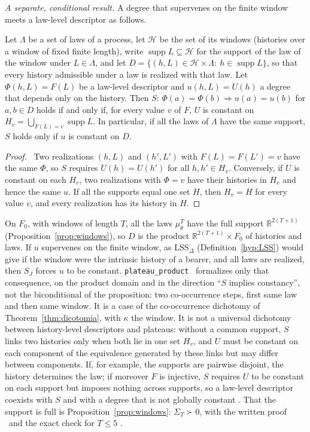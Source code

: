 \emph{A separate, conditional result.} A degree that supervenes on the finite window meets a law-level descriptor as follows.
\begin{proposition}[Plateau]\label{prop:gauss-plateau}
Let $\Lambda$ be a set of laws of a process, let $\mathcal H$ be the set of its windows (histories over a window of fixed finite length), write $\operatorname{supp}L\subseteq\mathcal H$ for the support of the law of the window under $L\in\Lambda$, and let $D=\{(h,L)\in\mathcal H\times\Lambda:\ h\in\operatorname{supp}L\}$, so that every history admissible under a law is realized with that law. Let $\Phi(h,L)=F(L)$ be a law-level descriptor and $u(h,L)=U(h)$ a degree that depends only on the history. Then $S$: $\Phi(a)=\Phi(b)\Rightarrow u(a)=u(b)$ for $a,b\in D$ holds if and only if, for every value $v$ of $F$, $U$ is constant on $H_v=\bigcup_{F(L)=v}\operatorname{supp}L$. In particular, if all the laws of $\Lambda$ have the same support, $S$ holds only if $u$ is constant on $D$.
\end{proposition}
\begin{proof}
\stA\ Two realizations $(h,L)$ and $(h',L')$ with $F(L)=F(L')=v$ have the same $\Phi$, so $S$ requires $U(h)=U(h')$ for all $h,h'\in H_v$. Conversely, if $U$ is constant on each $H_v$, two realizations with $\Phi=v$ have their histories in $H_v$ and hence the same $u$. If all the supports equal one set $H$, then $H_v=H$ for every value $v$, and every realization has its history in $H$.
\end{proof}
On $F_0$, with windows of length $T$, all the laws $\mu_\theta^T$ have the full support $\mathbb R^{2(T+1)}$ (Proposition~\ref{prop:windows}), so $D$ is the product $\mathbb R^{2(T+1)}\times F_0$ of histories and laws. If $u$ supervenes on the finite window, as LSS$_\Delta$ (Definition~\ref{hyp:LSS}) would give if the window were the intrinsic history of a bearer, and all laws are realized, then $S_J$ forces $u$ to be constant. \texttt{plateau\_product} \stL\ formalizes only that consequence, on the product domain and in the direction ``$S$ implies constancy'', not the biconditional of the proposition: two co-occurrence steps, first same law and then same window. It is a case of the co-occurrence dichotomy of Theorem~\ref{thm:dicotomia}, with $\kappa$ the window. It is not a universal dichotomy between history-level descriptors and plateaus: without a common support, $S$ links two histories only when both lie in one set $H_v$, and $U$ must be constant on each component of the equivalence generated by these links but may differ between components. If, for example, the supports are pairwise disjoint, the history determines the law; if moreover $F$ is injective, $S$ requires $U$ to be constant on each support but imposes nothing across supports, so a law-level descriptor coexists with $S$ and with a degree that is not globally constant \stA. That the support is full is Proposition~\ref{prop:windows}: $\Sigma_T\succ0$, with the written proof \stA\ and the exact check for $T\le5$ \stS.

